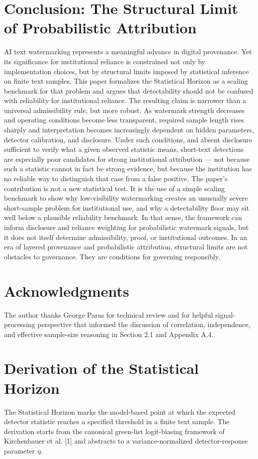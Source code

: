 \documentclass[11pt]{article}
\begin{document}
\section{Conclusion: The Structural Limit of Probabilistic Attribution}
AI text watermarking represents a meaningful advance in digital provenance. Yet its
significance for institutional reliance is constrained not only by implementation
choices, but by structural limits imposed by statistical inference on finite text
samples. This paper formalizes the Statistical Horizon as a scaling benchmark for
that problem and argues that detectability should not be confused with reliability for
institutional reliance.
The resulting claim is narrower than a universal admissibility rule, but more robust.
As watermark strength decreases and operating conditions become less transparent,
required sample length rises sharply and interpretation becomes increasingly
dependent on hidden parameters, detector calibration, and disclosure. Under such
conditions, and absent disclosure sufficient to verify what a given observed
statistic means, short-text detections are especially poor candidates for strong
institutional attribution --- not because such a statistic cannot in fact be
strong evidence, but because the institution has no reliable way to distinguish that
case from a false positive.
The paper's contribution is not a new statistical test. It is the use of a simple
scaling benchmark to show why low-visibility watermarking creates an unusually severe
short-sample problem for institutional use, and why a detectability floor may sit well
below a plausible reliability benchmark. In that sense, the framework can inform
disclosure and reliance weighting for probabilistic watermark signals, but it does not
itself determine admissibility, proof, or institutional outcomes.
In an era of layered provenance and probabilistic attribution, structural limits are
not obstacles to governance. They are conditions for governing responsibly.
\section*{Acknowledgments}
The author thanks George Paras for technical review and for helpful signal-processing
perspective that informed the discussion of correlation, independence, and effective
sample-size reasoning in Section 2.1 and Appendix A.4.
\appendix
\section{Derivation of the Statistical Horizon}
The Statistical Horizon marks the model-based point at which the expected detector
statistic reaches a specified threshold in a finite text sample. The derivation
starts from the canonical green-list logit-biasing framework of Kirchenbauer et al.
[1] and abstracts to a variance-normalized detector-response parameter $\eta$.
\end{document}
